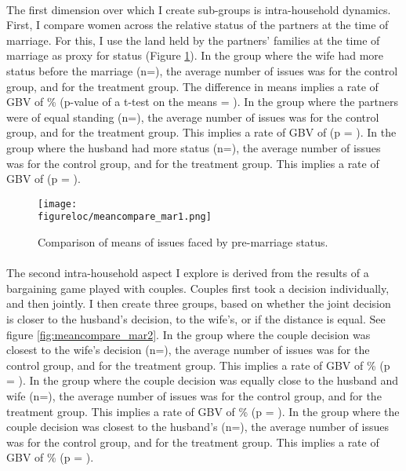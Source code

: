 \documentclass[11pt,a4paper]{scrartcl} %
\newcommand{\figureloc}{C:/Users/Koen/Dropbox/PhD/Papers/CongoGBV/Figures}
\begin{document}
\paragraph{}
 The first dimension over which I create sub-groups is intra-household dynamics. First, I compare women across the relative status of the partners at the time of marriage. For this, I use the land held by the partners' families at the time of marriage as proxy for status (Figure \ref{fig:meancompare_mar1}). In the group where the wife had more status before the marriage (n=), the average number of issues was  for the control group, and  for the treatment group. The difference in means implies a rate of GBV of \% (p-value of a t-test on the means = ). In the group where the partners were of equal standing (n=), the average number of issues was  for the control group, and  for the treatment group. This implies a rate of GBV of  (p = ). In the group where the husband had more status (n=), the average number of issues was  for the control group, and  for the treatment group. This implies a rate of GBV of  (p = ).

\begin{figure}[H]
  \texttt{[image: \\figureloc/meancompare\_mar1.png]}
  \caption{Comparison of means of issues faced by pre-marriage status.}
  \label{fig:meancompare_mar1}
\end{figure}

\paragraph{}
The second intra-household aspect I explore is derived from the results of a bargaining game played with couples. Couples first took a decision individually, and then jointly. I then create three groups, based on whether the joint decision is closer to the husband's decision, to the wife's, or if the distance is equal. See figure \ref{fig:meancompare_mar2}. In the group where the couple decision was closest to the wife's decision (n=), the average number of issues was  for the control group, and  for the treatment group. This implies a rate of GBV of \% (p = ). In the group where the couple decision was equally close to the husband and wife (n=), the average number of issues was  for the control group, and  for the treatment group. This implies a rate of GBV of \% (p = ). In the group where the couple decision was closest to the husband's (n=), the average number of issues was  for the control group, and  for the treatment group. This implies a rate of GBV of \% (p = ).
\end{document}
